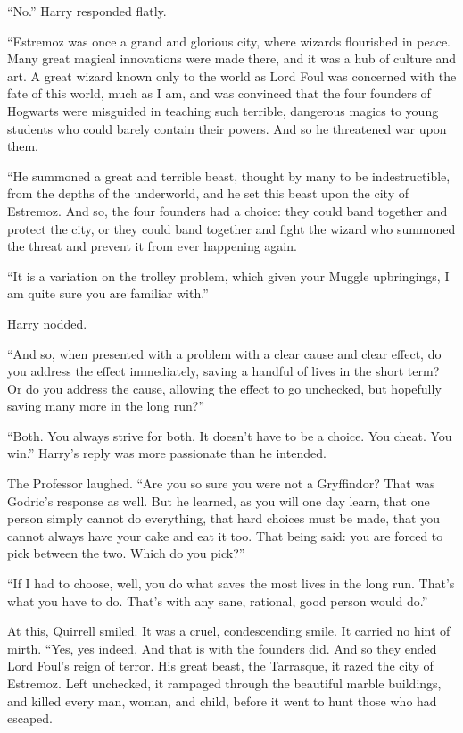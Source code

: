 “No.” Harry responded flatly.

“Estremoz was once a grand and glorious city, where wizards flourished in peace. Many great magical innovations were made there, and it was a hub of culture and art. A great wizard known only to the world as Lord Foul was concerned with the fate of this world, much as I am, and was convinced that the four founders of Hogwarts were misguided in teaching such terrible, dangerous magics to young students who could barely contain their powers. And so he threatened war upon them.

“He summoned a great and terrible beast, thought by many to be indestructible, from the depths of the underworld, and he set this beast upon the city of Estremoz. And so, the four founders had a choice: they could band together and protect the city, or they could band together and fight the wizard who summoned the threat and prevent it from ever happening again.

“It is a variation on the trolley problem, which given your Muggle upbringings, I am quite sure you are familiar with.”

Harry nodded.

“And so, when presented with a problem with a clear cause and clear effect, do you address the effect immediately, saving a handful of lives in the short term? Or do you address the cause, allowing the effect to go unchecked, but hopefully saving many more in the long run?”

“Both. You always strive for both. It doesn’t have to be a choice. You cheat. You win.” Harry’s reply was more passionate than he intended.

The Professor laughed. “Are you so sure you were not a Gryffindor? That was Godric’s response as well. But he learned, as you will one day learn, that one person simply cannot do everything, that hard choices must be made, that you cannot always have your cake and eat it too. That being said: you are forced to pick between the two. Which do you pick?”

“If I had to choose, well, you do what saves the most lives in the long run. That’s what you have to do. That’s with any sane, rational, good person would do.”

At this, Quirrell smiled. It was a cruel, condescending smile. It carried no hint of mirth. “Yes, yes indeed. And that is with the founders did. And so they ended Lord Foul’s reign of terror. His great beast, the Tarrasque, it razed the city of Estremoz. Left unchecked, it rampaged through the beautiful marble buildings, and killed every man, woman, and child, before it went to hunt those who had escaped.


